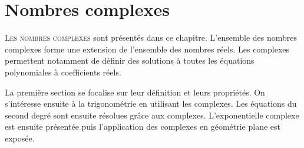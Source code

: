 \chapter{Nombres complexes}
\label{chap:complexes}
\minitoc
\minilof
\minilot

\lettrine{L}{es nombres complexes} sont présentés dans ce chapitre. L'ensemble des nombres complexes forme une extension de l'ensemble des nombres réels. Les complexes permettent notamment de définir des solutions à toutes les équations polynomiales à coefficients réels. 

La première section se focalise sur leur définition et leurs propriétés. On s'intéresse ensuite à la trigonométrie en utilisant les complexes. Les équations du second degré sont ensuite résolues grâce aux complexes. L'exponentielle complexe est ensuite présentée puis l'application des complexes en géométrie plane est exposée.

